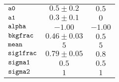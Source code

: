 \begin{tabular}{lcc}
$\verb+a0+ $ & $  0.5\pm 0.2$ & $ 0.5$\\
$\verb+a1+ $ & $  0.3\pm 0.1$ & $ 0$\\
$\verb+alpha+ $ & $ -1.00$ & $-1.00$\\
$\verb+bkgfrac+ $ & $  0.46\pm 0.03$ & $ 0.5$\\
$\verb+mean+ $ & $  5$ & $ 5$\\
$\verb+sig1frac+ $ & $  0.79\pm 0.05$ & $ 0.8$\\
$\verb+sigma1+ $ & $  0.5$ & $ 0.5$\\
$\verb+sigma2+ $ & $  1$ & $ 1$\\
\end{tabular}
